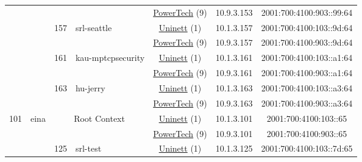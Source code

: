 \begin{small}
\begin{center}
\begin{longtable}{|c|c|c|c|c|c|c|c|}
  &  &  &  & \multicolumn{2}{|c|}{\tiny{\href{http://www.powertech.no}{PowerTech} (9)}} & \tiny{10.9.3.153} & \tiny{2001:700:4100:903::99:64} \\* \cline{3-3}\cline{4-4}\cline{5-5}\cline{6-6}\cline{7-7}\cline{8-8}
  &  & \multirow{2}{*}{\tiny{157}} & \multicolumn{1}{|l|}{\multirow{2}{*}{\tiny{srl-seattle}}} & \multicolumn{2}{|c|}{\tiny{\href{https://www.uninett.no}{Uninett} (1)}} & \tiny{10.1.3.157} & \tiny{2001:700:4100:103::9d:64} \\* \cline{5-5}\cline{6-6}\cline{7-7}\cline{8-8}
  &  &  &  & \multicolumn{2}{|c|}{\tiny{\href{http://www.powertech.no}{PowerTech} (9)}} & \tiny{10.9.3.157} & \tiny{2001:700:4100:903::9d:64} \\* \cline{3-3}\cline{4-4}\cline{5-5}\cline{6-6}\cline{7-7}\cline{8-8}
  &  & \multirow{2}{*}{\tiny{161}} & \multicolumn{1}{|l|}{\multirow{2}{*}{\tiny{kau-mptcpsecurity}}} & \multicolumn{2}{|c|}{\tiny{\href{https://www.uninett.no}{Uninett} (1)}} & \tiny{10.1.3.161} & \tiny{2001:700:4100:103::a1:64} \\* \cline{5-5}\cline{6-6}\cline{7-7}\cline{8-8}
  &  &  &  & \multicolumn{2}{|c|}{\tiny{\href{http://www.powertech.no}{PowerTech} (9)}} & \tiny{10.9.3.161} & \tiny{2001:700:4100:903::a1:64} \\* \cline{3-3}\cline{4-4}\cline{5-5}\cline{6-6}\cline{7-7}\cline{8-8}
  &  & \multirow{2}{*}{\tiny{163}} & \multicolumn{1}{|l|}{\multirow{2}{*}{\tiny{hu-jerry}}} & \multicolumn{2}{|c|}{\tiny{\href{https://www.uninett.no}{Uninett} (1)}} & \tiny{10.1.3.163} & \tiny{2001:700:4100:103::a3:64} \\* \cline{5-5}\cline{6-6}\cline{7-7}\cline{8-8}
  &  &  &  & \multicolumn{2}{|c|}{\tiny{\href{http://www.powertech.no}{PowerTech} (9)}} & \tiny{10.9.3.163} & \tiny{2001:700:4100:903::a3:64} \\ \hline
 \multirow{16}{*}{\tiny{101}} & \multicolumn{1}{|l|}{\multirow{16}{*}{\tiny{eina}}} & \multicolumn{2}{|c|}{\multirow{2}{*}{\tiny{Root Context}}} & \multicolumn{2}{|c|}{\tiny{\href{https://www.uninett.no}{Uninett} (1)}} & \tiny{10.1.3.101} & \tiny{2001:700:4100:103::65} \\* \cline{5-5}\cline{6-6}\cline{7-7}\cline{8-8}
  &  & \multicolumn{2}{|c|}{} & \multicolumn{2}{|c|}{\tiny{\href{http://www.powertech.no}{PowerTech} (9)}} & \tiny{10.9.3.101} & \tiny{2001:700:4100:903::65} \\* \cline{3-3}\cline{4-4}\cline{5-5}\cline{6-6}\cline{7-7}\cline{8-8}
  &  & \multirow{2}{*}{\tiny{125}} & \multicolumn{1}{|l|}{\multirow{2}{*}{\tiny{srl-test}}} & \multicolumn{2}{|c|}{\tiny{\href{https://www.uninett.no}{Uninett} (1)}} & \tiny{10.1.3.125} & \tiny{2001:700:4100:103::7d:65} \\* \cline{5-5}\cline{6-6}\cline{7-7}\cline{8-8}

\end{longtable}
\end{center}
\end{small}
